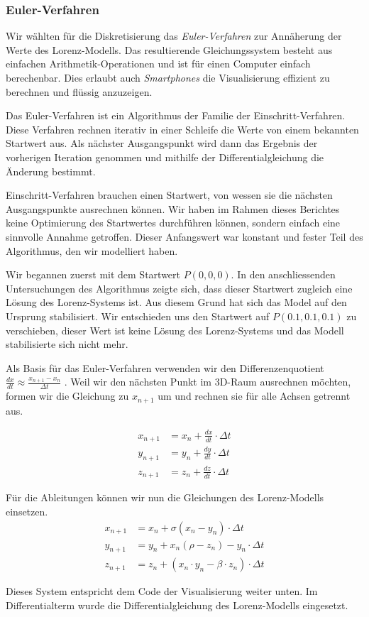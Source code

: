 \subsubsection{Euler-Verfahren} \label{euler-verfahren}

Wir wählten für die Diskretisierung das \textit{Euler-Verfahren} zur Annäherung der Werte des Lorenz-Modells. Das resultierende Gleichungssystem besteht aus einfachen Arithmetik-Operationen und ist für einen Computer einfach berechenbar. Dies erlaubt auch \textit{Smartphones} die Visualisierung effizient zu berechnen und flüssig anzuzeigen.

Das Euler-Verfahren ist ein Algorithmus der Familie der Einschritt-Verfahren. Diese Verfahren rechnen iterativ in einer Schleife die Werte von einem bekannten Startwert aus. Als nächster Ausgangspunkt wird dann das Ergebnis der vorherigen Iteration genommen und mithilfe der Differentialgleichung die Änderung bestimmt. 

Einschritt-Verfahren brauchen einen Startwert, von wessen sie die nächsten Ausgangspunkte ausrechnen können. Wir haben im Rahmen dieses Berichtes keine Optimierung des Startwertes durchführen können, sondern einfach eine sinnvolle Annahme getroffen. Dieser Anfangswert war konstant und fester Teil des Algorithmus, den wir modelliert haben.

Wir begannen zuerst mit dem Startwert $ P(0, 0, 0) $. In den anschliessenden Untersuchungen des Algorithmus zeigte sich, dass dieser Startwert zugleich eine Lösung des Lorenz-Systems ist. Aus diesem Grund hat sich das Model auf den Ursprung stabilisiert. Wir entschieden uns den Startwert auf $ P(0.1, 0.1, 0.1) $ zu verschieben, dieser Wert ist keine Lösung des Lorenz-Systems und das Modell stabilisierte sich nicht mehr.

Als Basis für das Euler-Verfahren verwenden wir den Differenzenquotient $ \frac{dx}{dt} \approx \frac{x_{n + 1} - x_n}{\Delta t} $ \cite{dahmen2008}.  Weil wir den nächsten Punkt im 3D-Raum ausrechnen möchten, formen wir die Gleichung zu $ x_{n + 1} $  um und rechnen sie für alle Achsen getrennt aus.

\begin{align}
    x_{n + 1} &= x_n + \frac{dx}{dt} \cdot \Delta t\\
    y_{n + 1} &= y_n + \frac{dy}{dt} \cdot \Delta t\\
    z_{n + 1} &= z_n + \frac{dz}{dt} \cdot \Delta t
\end{align}

Für die Ableitungen können wir nun die Gleichungen des Lorenz-Modells einsetzen.
\begin{align}
    x_{n + 1} &= x_n + \sigma(x_n - y_n) \cdot \Delta t\\
    y_{n + 1} &= y_n + x_n(\rho - z_n) - y_n \cdot \Delta t\\
    z_{n + 1} &= z_n + (x_n \cdot y_n - \beta \cdot z_n) \cdot \Delta t
\end{align}

Dieses System entspricht dem Code der Visualisierung weiter unten. Im Differentialterm wurde die Differentialgleichung des Lorenz-Modells eingesetzt.
